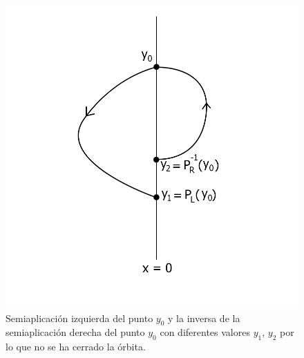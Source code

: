 \documentclass[12pt,a4paper]{report} %
\begin{document}
	\begin{figure}[h]
		\centering
		\includegraphics[width=1.1\textwidth,center]{aplipoincareL-R.jpg}
		\caption{Semiaplicación izquierda del punto $y_0$ y la inversa de la semiaplicación derecha del punto $y_0$ con diferentes valores $y_1$, $y_2$ por lo que no se ha cerrado la órbita.}
		\label{fig:aplipoincareL-R}
	\end{figure}
	
	\newpage
	
\end{document}
